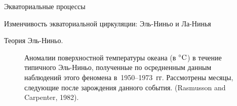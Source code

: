 \begin{chapter}{Экваториальные процессы}
\begin{section}{Изменчивость экваториальной циркуляции: Эль-Ниньо и Ла-Нинья}
\begin{paragraph}{Теория Эль-Ниньо.}
\begin{figure}[p!]
\caption{Аномалии
поверхностной температуры океана (в ${}^\circ\mbox{C}$) в течение типичного
Эль-Ниньо, полученные по осредненным данным наблюдений этого феномена 
в~1950--1973~гг. Рассмотрены месяцы, следующие после зарождения данного 
события. (Rasmusson and Carpenter, 1982).}
\label{fig:elninoanomalies}
\end{figure}
%


\end{paragraph}
\end{section}
\end{chapter}
